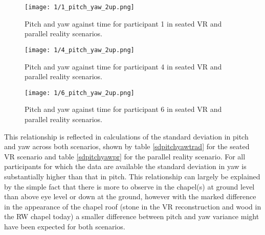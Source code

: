 \begin{figure}
	\begin{center}
	\texttt{[image: 1/1\_pitch\_yaw\_2up.png]}
	\caption{Pitch and yaw against time for participant 1 in seated VR and parallel reality scenarios.}
	\label{1_pitch_yaw_2up.png}
	\end{center}
\end{figure}

\begin{figure}
	\begin{center}
	\texttt{[image: 1/4\_pitch\_yaw\_2up.png]}
	\caption{Pitch and yaw against time for participant 4 in seated VR and parallel reality scenarios.}
	\label{4_pitch_yaw_2up.png}
	\end{center}
\end{figure}

\begin{figure}
	\begin{center}
	\texttt{[image: 1/6\_pitch\_yaw\_2up.png]}
	\caption{Pitch and yaw against time for participant 6 in seated VR and parallel reality scenarios.}
	\label{6_pitch_yaw_2up.png}
	\end{center}
\end{figure}

This relationship is reflected in calculations of the standard deviation in pitch and yaw across both scenarios, shown by table \ref{sdpitchyawtrad} for the seated VR scenario and table \ref{sdpitchyawpr} for the parallel reality scenario. For all participants for which the data are available the standard deviation in yaw is substantially higher than that in pitch. This relationship can largely be explained by the simple fact that there is more to observe in the chapel(s) at ground level than above eye level or down at the ground, however with the marked difference in the appearance of the chapel roof (stone in the VR reconstruction and wood in the RW chapel today) a smaller difference between pitch and yaw variance might have been expected for both scenarios.

